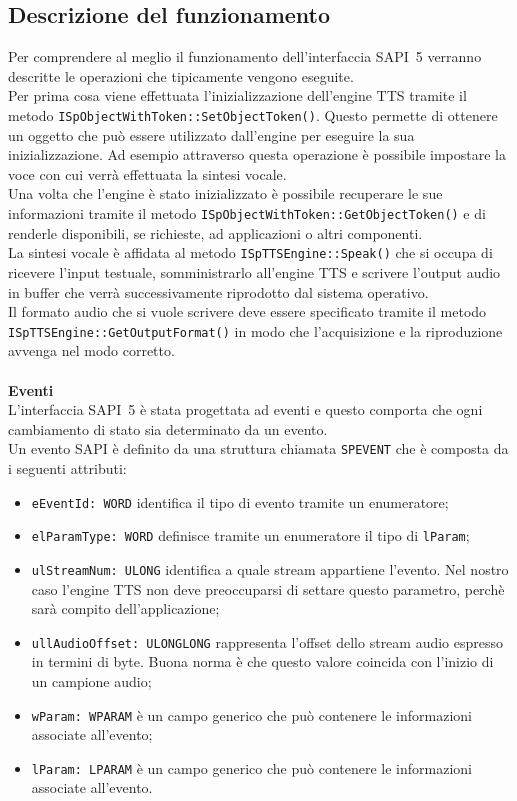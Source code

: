 \subsection{Descrizione del funzionamento}
Per comprendere al meglio il funzionamento dell'interfaccia SAPI~5 verranno descritte le operazioni che tipicamente vengono eseguite.\\
Per prima cosa viene effettuata l'inizializzazione dell'engine TTS tramite il metodo \texttt{ISpObjectWithToken::SetObjectToken()}. Questo permette di ottenere un oggetto che può essere utilizzato dall'engine per eseguire la sua inizializzazione.
Ad esempio attraverso questa operazione è possibile impostare la voce con cui verrà effettuata la sintesi vocale.\\
Una volta che l'engine è stato inizializzato è possibile recuperare le sue informazioni tramite il metodo \texttt{ISpObjectWithToken::GetObjectToken()} e di renderle disponibili, se richieste, ad applicazioni o altri componenti.\\
La sintesi vocale è affidata al metodo \texttt{ISpTTSEngine::Speak()} che si occupa di ricevere l'input testuale, somministrarlo all'engine TTS e scrivere l'output audio in buffer che verrà successivamente riprodotto dal sistema operativo.\\
Il formato audio che si vuole scrivere deve essere specificato tramite il metodo \texttt{ISpTTSEngine::GetOutputFormat()} in modo che l'acquisizione e la riproduzione avvenga nel modo corretto.\\\\
\textbf{Eventi}\\
L'interfaccia SAPI~5 è stata progettata ad eventi e questo comporta che ogni cambiamento di stato sia determinato da un evento.\\
Un evento SAPI è definito da una struttura chiamata \texttt{SPEVENT} che è composta da i seguenti attributi:
\begin{itemize}
	\item \texttt{eEventId: WORD} identifica il tipo di evento tramite un enumeratore;
	\item \texttt{elParamType: WORD} definisce tramite un enumeratore il tipo di \texttt{lParam};
	\item \texttt{ulStreamNum: ULONG} identifica a quale stream appartiene l'evento. Nel nostro caso l'engine TTS non deve preoccuparsi di settare questo parametro, perchè sarà compito dell'applicazione;
	\item \texttt{ullAudioOffset: ULONGLONG} rappresenta l'offset dello stream audio espresso in termini di byte. Buona norma è che questo valore coincida con l'inizio di un campione audio;
	\item \texttt{wParam: WPARAM} è un campo generico che può contenere le informazioni associate all'evento;
	\item \texttt{lParam: LPARAM} è un campo generico che può contenere le informazioni associate all'evento.
\end{itemize}
